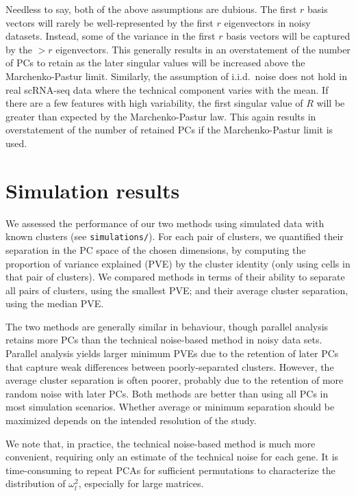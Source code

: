 \documentclass{article}
\begin{document}
Needless to say, both of the above assumptions are dubious.
The first $r$ basis vectors will rarely be well-represented by the first $r$ eigenvectors in noisy datasets.
Instead, some of the variance in the first $r$ basis vectors will be captured by the $>r$ eigenvectors.
This generally results in an overstatement of the number of PCs to retain as the later singular values will be increased above the Marchenko-Pastur limit.
Similarly, the assumption of i.i.d.\ noise does not hold in real scRNA-seq data where the technical component varies with the mean.
If there are a few features with high variability, the first singular value of $R$ will be greater than expected by the Marchenko-Pastur law.
This again results in overstatement of the number of retained PCs if the Marchenko-Pastur limit is used. 

\section{Simulation results}
We assessed the performance of our two methods using simulated data with known clusters (see \texttt{simulations/}).
For each pair of clusters, we quantified their separation in the PC space of the chosen dimensions,
by computing the proportion of variance explained (PVE) by the cluster identity (only using cells in that pair of clusters).
We compared methods in terms of their ability to separate all pairs of clusters, using the smallest PVE;
and their average cluster separation, using the median PVE.

The two methods are generally similar in behaviour, though parallel analysis retains more PCs than the technical noise-based method in noisy data sets.
Parallel analysis yields larger minimum PVEs due to the retention of later PCs that capture weak differences between poorly-separated clusters.
However, the average cluster separation is often poorer, probably due to the retention of more random noise with later PCs.
Both methods are better than using all PCs in most simulation scenarios.
Whether average or minimum separation should be maximized depends on the intended resolution of the study.

We note that, in practice, the technical noise-based method is much more convenient, requiring only an estimate of the technical noise for each gene.
It is time-consuming to repeat PCAs for sufficient permutations to characterize the distribution of $\omega^2_l$, especially for large matrices.
\end{document}
